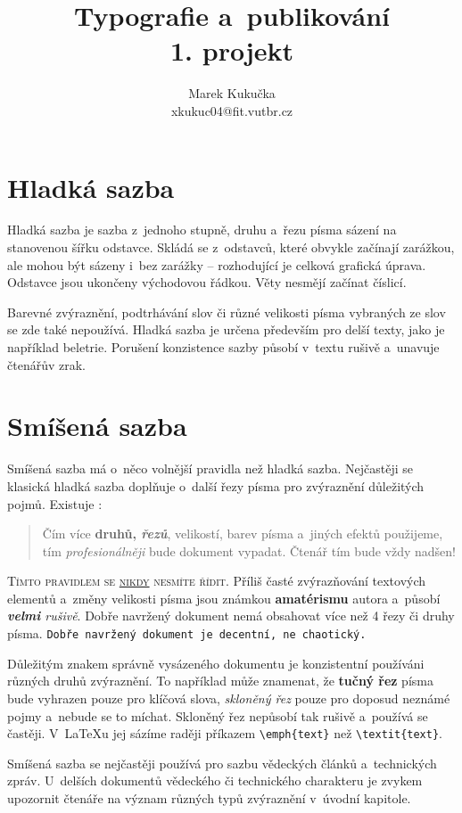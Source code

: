 \documentclass[11pt,twocolumn]{article}
\title{Typografie a~publikování \\
	   1. projekt}
\author{Marek Kukučka \\
		xkukuc04@fit.vutbr.cz}
\date{}
\begin{document}
\maketitle

\section{Hladká sazba}
Hladká sazba je sazba z~jednoho stupně, druhu a~řezu písma sázení na stanovenou
šířku odstavce. Skládá se z~odstavců, které obvykle začínají zarážkou, ale mohou
být sázeny i~bez zarážky -- rozhodující je celková grafická úprava. Odstavce jsou 
ukončeny východovou řádkou. Věty nesmějí začínat číslicí.
\par 
Barevné zvýraznění, podtrhávání slov či různé velikosti písma vybraných ze slov
se zde také nepoužívá. Hladká sazba je určena především pro delší texty, jako je například beletrie. Porušení konzistence sazby působí v~textu rušivě a~unavuje čtenářův zrak.

\section{Smíšená sazba}
Smíšená sazba má o~něco volnější pravidla než hladká sazba. Nejčastěji se klasická hladká sazba doplňuje o~další řezy písma pro zvýraznění důležitých pojmů. Existuje :\par
\begin{quotation}
Čím více \textbf{druhů, \emph{řezů}}, {\scriptsize velikostí}, barev písma a~jiných efektů použijeme, tím \emph{profesionálněji} bude dokument vypadat. Čtenář tím bude vždy {\Huge nadšen!}
\end{quotation}
\par
\textsc{Tímto pravidlem se \underline{nikdy} nesmíte řídit}. Příliš časté zvýrazňování textových elementů a~změny velikosti {\tiny písma} jsou {\LARGE známkou} \textbf{\huge amatérismu} autora a~působí \emph{\textbf{velmi} rušivě}. Dobře navržený dokument nemá obsahovat více než 4 řezy či druhy písma. \texttt{Dobře navržený dokument je decentní, ne chaotický.}
\par
Důležitým znakem správně vysázeného dokumentu je konzistentní používáni různých druhů zvýraznění. To například může znamenat, že \textbf{tučný řez} písma bude vyhrazen pouze pro klíčová slova, \emph{skloněný řez} pouze pro doposud neznámé pojmy a~nebude se to míchat. Skloněný řez nepůsobí tak rušivě a~používá se častěji. V~\LaTeX u jej sázíme raději příkazem 
\verb|\emph{text}| než \verb|\textit{text}|.
\par
Smíšená sazba se nejčastěji používá pro sazbu vědeckých článků a~technických zpráv. U~delších dokumentů vědeckého či technického charakteru je zvykem upozornit čtenáře na význam různých typů zvýraznění v~úvodní kapitole.
\end{document}
